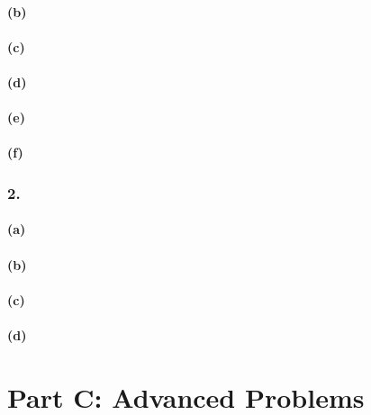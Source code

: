 \documentclass[12pt]{report}
\begin{document}
\subsubsection*{(b)}

\subsubsection*{(c)}

\subsubsection*{(d)}

\subsubsection*{(e)}

\subsubsection*{(f)}

\subsection*{2.}
\subsubsection*{(a)}

\subsubsection*{(b)}

\subsubsection*{(c)}

\subsubsection*{(d)}

\chapter*{Part C: Advanced Problems}
\end{document}
